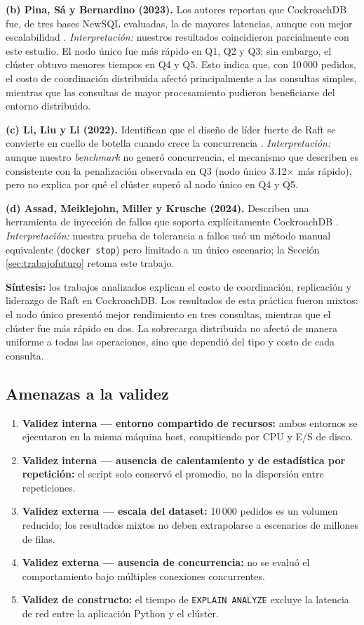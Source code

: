 \documentclass[10pt,letterpaper]{article}
\begin{document}
\textbf{(b) Pina, Sá y Bernardino (2023).} Los autores reportan que CockroachDB fue, de tres bases NewSQL evaluadas, la de mayores latencias, aunque con mejor escalabilidad \citep{pina2023newsql}. \textit{Interpretación:} nuestros resultados coincidieron parcialmente con este estudio. El nodo único fue más rápido en Q1, Q2 y Q3; sin embargo, el clúster obtuvo menores tiempos en Q4 y Q5. Esto indica que, con 10\,000 pedidos, el costo de coordinación distribuida afectó principalmente a las consultas simples, mientras que las consultas de mayor procesamiento pudieron beneficiarse del entorno distribuido.

\textbf{(c) Li, Liu y Li (2022).} Identifican que el diseño de líder fuerte de Raft se convierte en cuello de botella cuando crece la concurrencia \citep{li2022raft}. \textit{Interpretación:} aunque nuestro \textit{benchmark} no generó concurrencia, el mecanismo que describen es consistente con la penalización observada en Q3 (nodo único 3.12$\times$ más rápido), pero no explica por qué el clúster superó al nodo único en Q4 y Q5.

\textbf{(d) Assad, Meiklejohn, Miller y Krusche (2024).} Describen una herramienta de inyección de fallos que soporta explícitamente CockroachDB \citep{assad2024fault}. \textit{Interpretación:} nuestra prueba de tolerancia a fallos usó un método manual equivalente (\texttt{docker stop}) pero limitado a un único escenario; la Sección \ref{sec:trabajofuturo} retoma este trabajo.

\textbf{Síntesis:} los trabajos analizados explican el costo de coordinación, replicación y liderazgo de Raft en CockroachDB. Los resultados de esta práctica fueron mixtos: el nodo único presentó mejor rendimiento en tres consultas, mientras que el clúster fue más rápido en dos. La sobrecarga distribuida no afectó de manera uniforme a todas las operaciones, sino que dependió del tipo y costo de cada consulta.

\subsection{Amenazas a la validez}
\label{sec:amenazas}
\begin{enumerate}[leftmargin=*]
\item \textbf{Validez interna — entorno compartido de recursos:} ambos entornos se ejecutaron en la misma máquina host, compitiendo por CPU y E/S de disco.
\item \textbf{Validez interna — ausencia de calentamiento y de estadística por repetición:} el script solo conservó el promedio, no la dispersión entre repeticiones.
\item \textbf{Validez externa — escala del dataset:} 10\,000 pedidos es un volumen reducido; los resultados mixtos no deben extrapolarse a escenarios de millones de filas.
\item \textbf{Validez externa — ausencia de concurrencia:} no se evaluó el comportamiento bajo múltiples conexiones concurrentes.
\item \textbf{Validez de constructo:} el tiempo de \texttt{EXPLAIN ANALYZE} excluye la latencia de red entre la aplicación Python y el clúster.
\end{enumerate}
\end{document}
